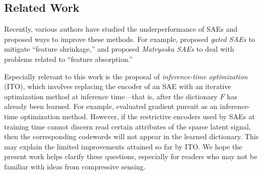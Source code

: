 \subsection*{Related Work}

Recently, various authors have studied the underperformance of SAEs and proposed ways to improve these methods. For example, \cite{rajamanoharan_improving_2024} proposed \textit{gated SAEs} to mitigate ``feature shrinkage,'' and \cite{bussmann_learning_2025} proposed \textit{Matryoska SAEs} to deal with problems related to ``feature absorption.''

Especially relevant to this work is the proposal of \textit{inference-time optimization} (ITO), which involves replacing the encoder of an SAE with an iterative optimization method at inference time---that is, after the dictionary $F$ has already been learned. For example,  \cite{engels_decomposing_2024} evaluated gradient pursuit as an inference-time optimization method. However, if the restrictive encoders used by SAEs at training time cannot discern read certain attributes of the sparse latent signal, then the corresponding codewords will not appear in the learned dictionary. This may explain the limited improvements attained so far by ITO. We hope the present work helps clarify these questions, especially for readers who may not be familiar with ideas from compressive sensing.
